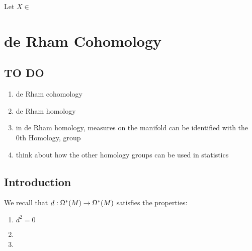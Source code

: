 \documentclass{book}
\begin{document}
\begin{defn}
	Let $X \in $
\end{defn}


































\newpage
\chapter{de Rham Cohomology}


\section{TO DO}
\begin{enumerate}
	\item de Rham cohomology
	\item de Rham homology
	\item in de Rham homology, measures on the manifold can be identified with the 0th Homology, group
	\item think about how the other homology groups can be used in statistics
\end{enumerate}


\section{Introduction}

\begin{note}
	We recall that $d: \Omega^*(M) \rightarrow \Omega^*(M)$ satisfies the properties:
	\begin{enumerate}
		\item $d^2 = 0$
		\item 
		\item 
	\end{enumerate}
\end{note}
\end{document}
